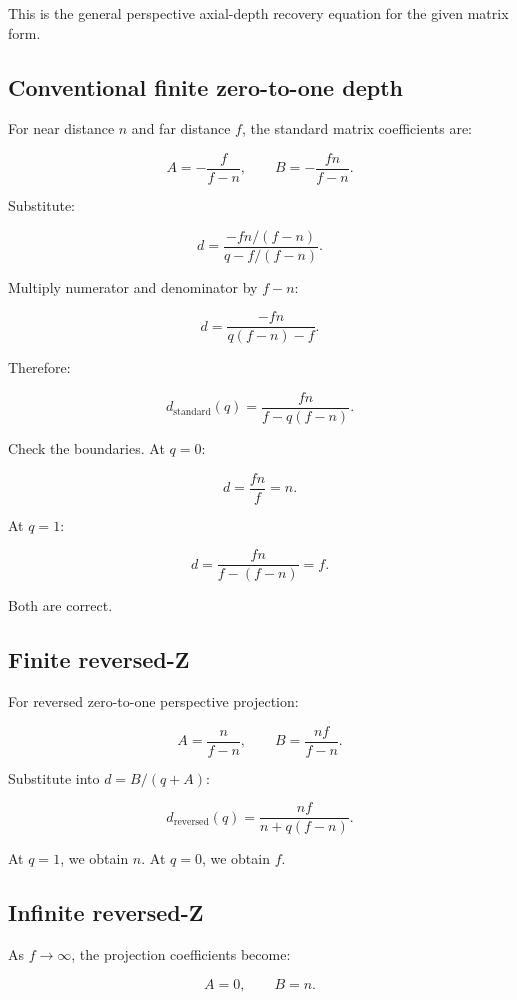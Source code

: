 This is the general perspective axial-depth recovery equation for the given matrix form.

\subsection{Conventional finite zero-to-one depth}\label{02-foundations-ii-ch035-conventional-finite-zero-to-one-depth}

For near distance \(n\) and far distance \(f\), the standard matrix coefficients are:

\[ A=-\frac f{f-n}, \qquad B=-\frac{fn}{f-n}. \]

Substitute:

\[ d= \frac{-fn/(f-n)} {q-f/(f-n)}. \]

Multiply numerator and denominator by \(f-n\):

\[ d=\frac{-fn}{q(f-n)-f}. \]

Therefore:

\[ \boxed{ d_{\mathrm{standard}}(q) = \frac{fn}{f-q(f-n)}. } \]

Check the boundaries. At \(q=0\):

\[ d=\frac{fn}{f}=n. \]

At \(q=1\):

\[ d=\frac{fn}{f-(f-n)}=f. \]

Both are correct.

\subsection{Finite reversed-Z}\label{02-foundations-ii-ch035-finite-reversed-z}

For reversed zero-to-one perspective projection:

\[ A=\frac n{f-n}, \qquad B=\frac{nf}{f-n}. \]

Substitute into \(d=B/(q+A)\):

\[ \boxed{ d_{\mathrm{reversed}}(q) = \frac{nf}{n+q(f-n)}. } \]

At \(q=1\), we obtain \(n\). At \(q=0\), we obtain \(f\).

\subsection{Infinite reversed-Z}\label{02-foundations-ii-ch035-infinite-reversed-z}

As \(f\to\infty\), the projection coefficients become:

\[ A=0,\qquad B=n. \]

